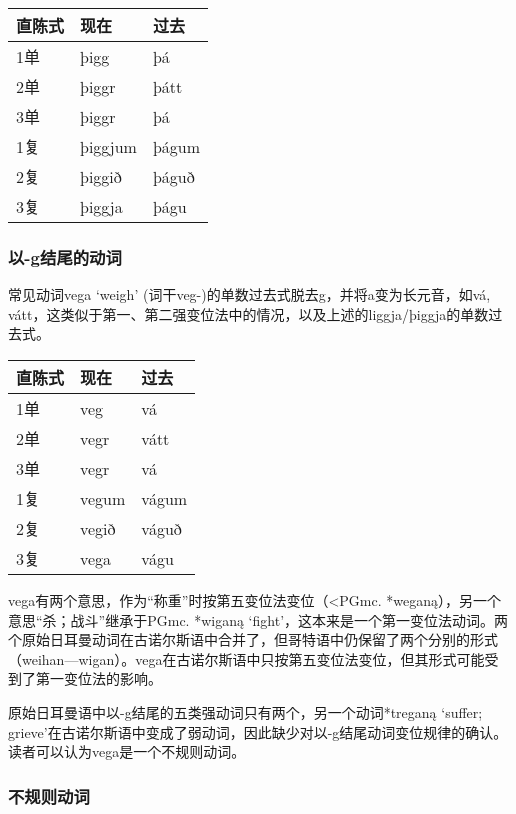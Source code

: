 \begin{longtable}{lll}
    \toprule
    直陈式 & 现在      & 过去    \\
    \midrule
    \endhead
    \bottomrule
    \endfoot
    1单  & þigg    & þá    \\
    2单  & þiggr   & þátt  \\
    3单  & þiggr   & þá    \\
    1复  & þiggjum & þágum \\
    2复  & þiggið  & þáguð \\
    3复  & þiggja  & þágu  \\
\end{longtable}

\subsubsection{以-g结尾的动词}

常见动词vega `weigh‌' (词干veg-)的单数过去式脱去g，并将a变为长元音，如vá, vátt，这类似于第一、第二强变位法中的情况，以及上述的liggja/þiggja的单数过去式。
\begin{longtable}{lll}
    \toprule
    直陈式 & 现在    & 过去    \\
    \midrule
    \endhead
    \bottomrule
    \endfoot
    1单  & veg   & vá    \\
    2单  & vegr  & vátt  \\
    3单  & vegr  & vá    \\
    1复  & vegum & vágum \\
    2复  & vegið & váguð \\
    3复  & vega  & vágu  \\
\end{longtable}

vega有两个意思，作为“称重”时按第五变位法变位（\textless PGmc.
*weganą），另一个意思“杀；战斗”继承于PGmc. *wiganą
`fight'，这本来是一个第一变位法动词。两个原始日耳曼动词在古诺尔斯语中合并了，但哥特语中仍保留了两个分别的形式（weihan---wigan）。vega在古诺尔斯语中只按第五变位法变位，但其形式可能受到了第一变位法的影响。

原始日耳曼语中以-g结尾的五类强动词只有两个，另一个动词*treganą `suffer; grieve'在古诺尔斯语中变成了弱动词，因此缺少对以-g结尾动词变位规律的确认。读者可以认为vega是一个不规则动词。


\subsubsection{不规则动词}

